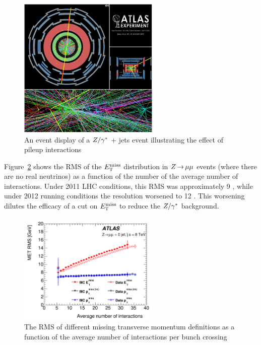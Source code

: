 \begin{figure}[h!]
  \centering
  \captionsetup{justification=centering}

  \includegraphics[width=0.6\textwidth]{figures/Zjets_EventDisplay}
  \caption{An event display of a $Z/\gamma^{\ast}$ + jets event illustrating the effect of pileup interactions}
  \label{fig:Zjetseventdisplay}
\end{figure}

Figure~\ref{fig:METResolution} shows the RMS of the $E_{\textrm{\footnotesize\sc t}}^{\rm miss}$ distribution in $Z\,{\rightarrow}\,\mu\mu$ events (where there are no real neutrinos) as a function of the number of the average number of interactions. Under 2011 LHC conditions, this RMS was approximately 9 \GeV, while under 2012 running conditions the resolution worsened to 12 \GeV. This worsening dilutes the efficacy of a cut on $E_{\textrm{\footnotesize\sc t}}^{\rm miss}$ to reduce the $Z/\gamma^{\ast}$ background. 

\begin{figure}[h!]
  \centering
  \captionsetup{justification=centering}

  \includegraphics[width=0.6\textwidth]{figures/METResolution}
  \caption{The RMS of different missing transverse momentum definitions as a function of the average number of interactions per bunch crossing}
  \label{fig:METResolution}
\end{figure}

